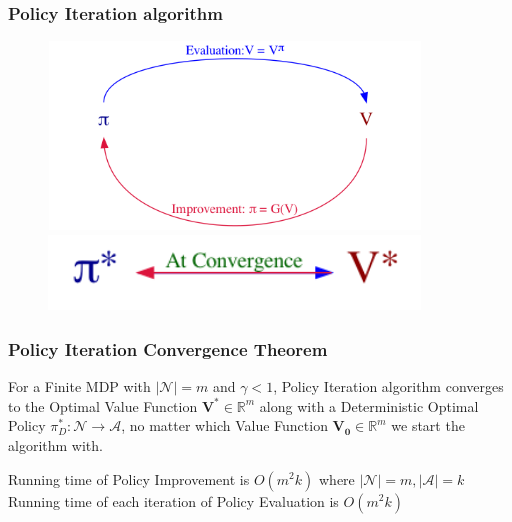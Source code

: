 \documentclass[handout]{beamer}
\newcommand{\bvs}{\bm{V}^*}
\begin{document}
\begin{frame}
\frametitle{Policy Iteration algorithm}
\includegraphics[width=12cm, height=5cm]{policy_iteration_loop.png}
\includegraphics[width=12cm, height=2cm]{policy_iteration_convergence.png}
\end{frame}

\begin{frame}
\frametitle{Policy Iteration Convergence Theorem}
\begin{theorem}
For a Finite MDP with $|\mathcal{N}| = m$ and $\gamma < 1$, Policy Iteration algorithm converges to the Optimal Value Function $\bvs \in \mathbb{R}^m$ along with a Deterministic Optimal Policy $\pi_D^*: \mathcal{N} \rightarrow \mathcal{A}$, no matter which Value Function $\bm{V_0} \in \mathbb{R}^m$ we start the algorithm with.
\label{eq:policy_iteration_convergence_theorem}
\end{theorem}
\vspace{5mm}
\pause
Running time of Policy Improvement is $O(m^2 k)$ where $|\mathcal{N}| = m, |\mathcal{A}| = k$\\
\vspace{2mm}
\pause
Running time of each iteration of Policy Evaluation is $O(m^2 k)$
\end{frame}
\end{document}
